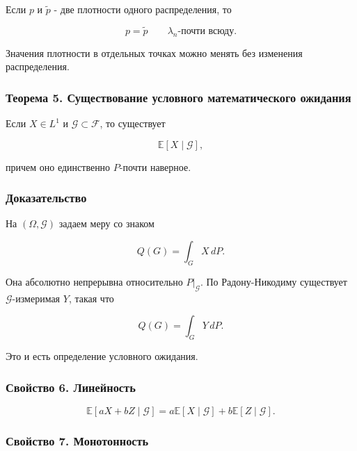\documentclass[
  11pt,
  a4paper,
]{article}
\begin{document}
Если \(p\) и \(\tilde p\) - две плотности одного распределения, то

\[
p=\tilde p
\qquad \lambda_n\text{-почти всюду}.
\]

Значения плотности в отдельных точках можно менять без изменения
распределения.

\subsubsection{Теорема 5. Существование условного математического
ожидания}\label{ux442ux435ux43eux440ux435ux43cux430-5.-ux441ux443ux449ux435ux441ux442ux432ux43eux432ux430ux43dux438ux435-ux443ux441ux43bux43eux432ux43dux43eux433ux43e-ux43cux430ux442ux435ux43cux430ux442ux438ux447ux435ux441ux43aux43eux433ux43e-ux43eux436ux438ux434ux430ux43dux438ux44f}

Если \(X\in L^1\) и \(\mathcal G\subset\mathcal F\), то существует

\[
\mathbb E[X\mid\mathcal G],
\]

причем оно единственно \(P\)-почти наверное.

\subsubsection{Доказательство}\label{ux434ux43eux43aux430ux437ux430ux442ux435ux43bux44cux441ux442ux432ux43e}

На \((\Omega,\mathcal G)\) задаем меру со знаком

\[
Q(G)=\int_GX\,dP.
\]

Она абсолютно непрерывна относительно \(P|_{\mathcal G}\). По
Радону-Никодиму существует \(\mathcal G\)-измеримая \(Y\), такая что

\[
Q(G)=\int_GY\,dP.
\]

Это и есть определение условного ожидания.

\subsubsection{Свойство 6.
Линейность}\label{ux441ux432ux43eux439ux441ux442ux432ux43e-6.-ux43bux438ux43dux435ux439ux43dux43eux441ux442ux44c}

\[
\mathbb E[aX+bZ\mid\mathcal G]
=
a\mathbb E[X\mid\mathcal G]
+b\mathbb E[Z\mid\mathcal G].
\]

\subsubsection{Свойство 7.
Монотонность}\label{ux441ux432ux43eux439ux441ux442ux432ux43e-7.-ux43cux43eux43dux43eux442ux43eux43dux43dux43eux441ux442ux44c}
\end{document}
